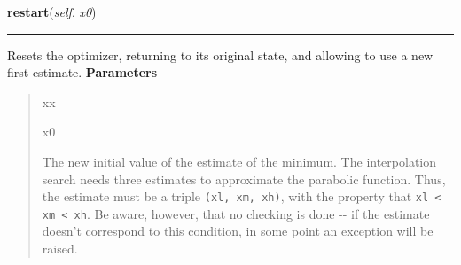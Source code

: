     \label{peach:optm:linear:Interpolation:restart}

    \vspace{0.5ex}

\hspace{.8\funcindent}\begin{boxedminipage}{\funcwidth}

    \raggedright \textbf{restart}(\textit{self}, \textit{x0})

    \vspace{-1.5ex}

    \rule{\textwidth}{0.5\fboxrule}
\setlength{\parskip}{2ex}

Resets the optimizer, returning to its original state, and allowing to
use a new first estimate.
\setlength{\parskip}{1ex}
      \textbf{Parameters}
      \vspace{-1ex}

      \begin{quote}
        \begin{Ventry}{xx}

          \item[x0]


The new initial value of the estimate of the minimum. The
interpolation search needs three estimates to approximate the
parabolic function. Thus, the estimate must be a triple
\texttt{(xl, xm, xh)}, with the property that \texttt{xl < xm < xh}. Be aware,
however, that no checking is done -{}- if the estimate doesn't
correspond to this condition, in some point an exception will be
raised.
        \end{Ventry}

      \end{quote}

    \end{boxedminipage}

    \vspace{0.5ex}


